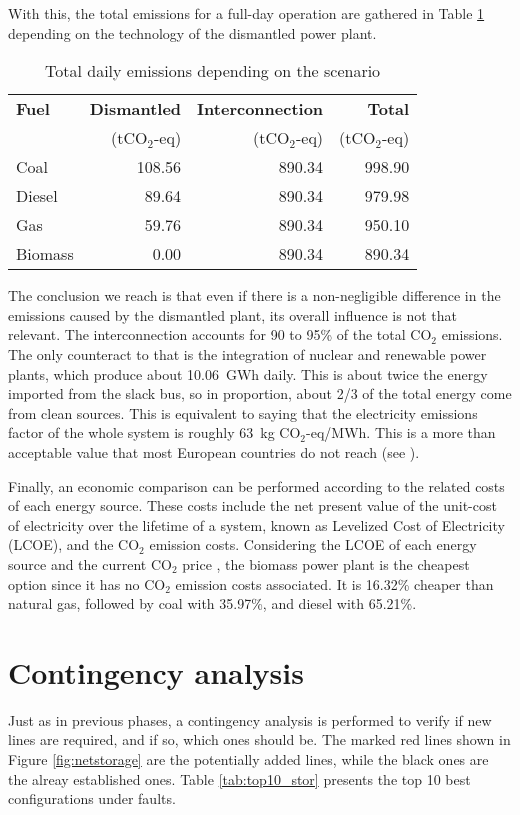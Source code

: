 With this, the total emissions for a full-day operation are gathered in Table \ref{tab:emit} depending on the technology of the dismantled power plant. 

\begin{table}[!htb]\centering
  \begin{tabular}{lrrr}
    \hline
    \textbf{Fuel} & \textbf{Dismantled} & \textbf{Interconnection} & \textbf{Total} \\
    & (tCO$_2$-eq) &  (tCO$_2$-eq)  &  (tCO$_2$-eq) \\
    \hline
    Coal & 108.56 & 890.34 & 998.90 \\
    Diesel & 89.64 & 890.34 & 979.98 \\
    Gas & 59.76 & 890.34 & 950.10 \\
    Biomass & 0.00 & 890.34 & 890.34 \\
    \hline
  \end{tabular}
  \caption{Total daily emissions depending on the scenario}
  \label{tab:emit}
\end{table}
The conclusion we reach is that even if there is a non-negligible difference in the emissions caused by the dismantled plant, its overall influence is not that relevant. The interconnection accounts for 90 to 95\% of the total CO$_2$ emissions. The only counteract to that is the integration of nuclear and renewable power plants, which produce about 10.06~GWh daily. This is about twice the energy imported from the slack bus, so in proportion, about 2/3 of the total energy come from clean sources. This is equivalent to saying that the electricity emissions factor of the whole system is roughly 63~kg CO$_2$-eq/MWh. This is a more than acceptable value that most European countries do not reach (see \cite{co2iea}).

Finally, an economic comparison can be performed according to the related costs of each energy source. These costs include the net present value of the unit-cost of electricity over the lifetime of a system, known as Levelized Cost of Electricity (LCOE), and the CO$_2$ emission costs. Considering the LCOE of each energy source \cite{irena, roussanaly2020techno, freeing, lazard} and the current CO$_2$ price \cite{ember}, the biomass power plant is the cheapest option since it has no CO$_2$ emission costs associated. It is 16.32\% cheaper than natural gas, followed by coal with 35.97\%, and diesel with 65.21\%.

\section{Contingency analysis}
Just as in previous phases, a contingency analysis is performed to verify if new lines are required, and if so, which ones should be. The marked red lines shown in Figure \ref{fig:netstorage} are the potentially added lines, while the black ones are the alreay established ones. Table \ref{tab:top10_stor} presents the top 10 best configurations under faults. 

